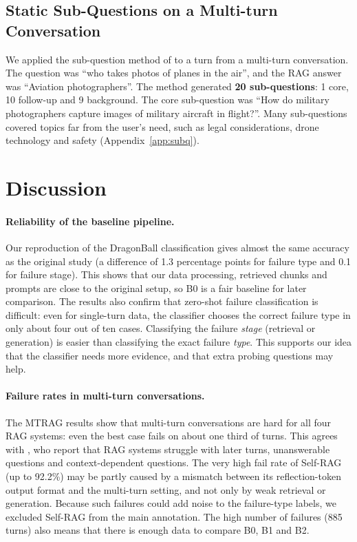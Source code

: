 \documentclass[11pt]{article}
\begin{document}
\subsection{Static Sub-Questions on a Multi-turn Conversation}
We applied the sub-question method of \citet{xie2024subquestion} to a turn from a multi-turn conversation. The question was ``who takes photos of planes in the air'', and the RAG answer was ``Aviation photographers''. The method generated \textbf{20 sub-questions}: 1 core, 10 follow-up and 9 background. The core sub-question was ``How do military photographers capture images of military aircraft in flight?''. Many sub-questions covered topics far from the user's need, such as legal considerations, drone technology and safety (Appendix~\ref{app:subq}).

\section{Discussion}
\label{sec:discussion}

\paragraph{Reliability of the baseline pipeline.}
Our reproduction of the DragonBall classification gives almost the same accuracy as the original study (a difference of 1.3 percentage points for failure type and 0.1 for failure stage). This shows that our data processing, retrieved chunks and prompts are close to the original setup, so B0 is a fair baseline for later comparison. The results also confirm that zero-shot failure classification is difficult: even for single-turn data, the classifier chooses the correct failure type in only about four out of ten cases. Classifying the failure \emph{stage} (retrieval or generation) is easier than classifying the exact failure \emph{type}. This supports our idea that the classifier needs more evidence, and that extra probing questions may help.

\paragraph{Failure rates in multi-turn conversations.}
The MTRAG results show that multi-turn conversations are hard for all four RAG systems: even the best case fails on about one third of turns. This agrees with \citet{katsis2025mtrag}, who report that RAG systems struggle with later turns, unanswerable questions and context-dependent questions. The very high fail rate of Self-RAG (up to 92.2\%) may be partly caused by a mismatch between its reflection-token output format and the multi-turn setting, and not only by weak retrieval or generation. Because such failures could add noise to the failure-type labels, we excluded Self-RAG from the main annotation. The high number of failures (885 turns) also means that there is enough data to compare B0, B1 and B2.
\end{document}

